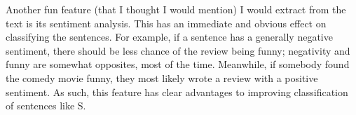 \begin{solution}
	Another fun feature (that I thought I would mention) I would extract from the text is its sentiment analysis. This has an immediate and obvious effect on classifying the sentences. For example, if a sentence has a generally negative sentiment, there should be less chance of the review being funny; negativity and funny are somewhat opposites, most of the time. Meanwhile, if somebody found the comedy movie funny, they most likely wrote a review with a positive sentiment. As such, this feature has clear advantages to improving classification of sentences like S.
	
\end{solution}
